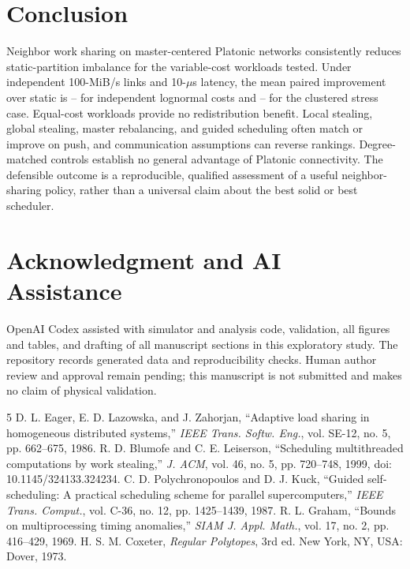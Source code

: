 \documentclass[10pt,journal,twocolumn]{IEEEtran}
\begin{document}
\section{Conclusion}
Neighbor work sharing on master-centered Platonic networks consistently reduces static-partition imbalance for the variable-cost workloads tested. Under independent 100-MiB/s links and 10-$\mu$s latency, the mean paired improvement over static is -- for independent lognormal costs and -- for the clustered stress case. Equal-cost workloads provide no redistribution benefit. Local stealing, global stealing, master rebalancing, and guided scheduling often match or improve on push, and communication assumptions can reverse rankings. Degree-matched controls establish no general advantage of Platonic connectivity. The defensible outcome is a reproducible, qualified assessment of a useful neighbor-sharing policy, rather than a universal claim about the best solid or best scheduler.

\section*{Acknowledgment and AI Assistance}
OpenAI Codex assisted with simulator and analysis code, validation, all figures and tables, and drafting of all manuscript sections in this exploratory study. The repository records generated data and reproducibility checks. Human author review and approval remain pending; this manuscript is not submitted and makes no claim of physical validation.

\begin{thebibliography}{5}
 D. L. Eager, E. D. Lazowska, and J. Zahorjan, ``Adaptive load sharing in homogeneous distributed systems,'' \emph{IEEE Trans. Softw. Eng.}, vol. SE-12, no. 5, pp. 662--675, 1986.
 R. D. Blumofe and C. E. Leiserson, ``Scheduling multithreaded computations by work stealing,'' \emph{J. ACM}, vol. 46, no. 5, pp. 720--748, 1999, doi: 10.1145/324133.324234.
 C. D. Polychronopoulos and D. J. Kuck, ``Guided self-scheduling: A practical scheduling scheme for parallel supercomputers,'' \emph{IEEE Trans. Comput.}, vol. C-36, no. 12, pp. 1425--1439, 1987.
 R. L. Graham, ``Bounds on multiprocessing timing anomalies,'' \emph{SIAM J. Appl. Math.}, vol. 17, no. 2, pp. 416--429, 1969.
 H. S. M. Coxeter, \emph{Regular Polytopes}, 3rd ed. New York, NY, USA: Dover, 1973.
\end{thebibliography}
\end{document}

